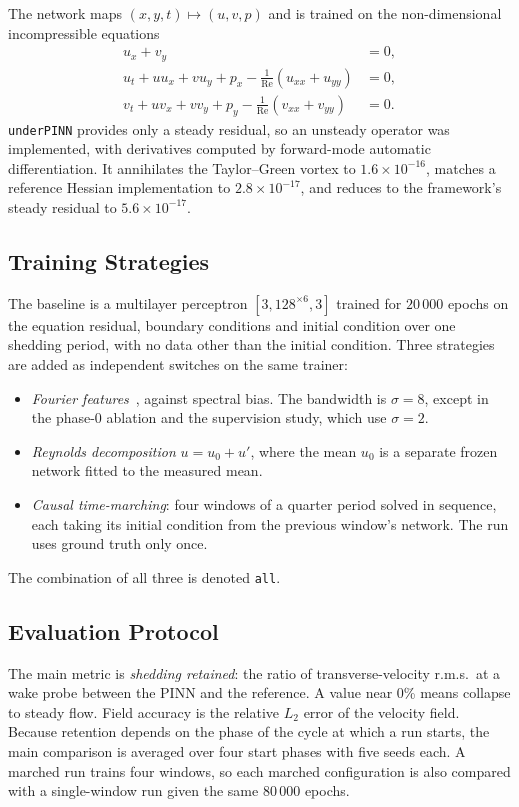 \documentclass[conference]{IEEEtran}
\newcommand{\Rey}{\mathrm{Re}}
\begin{document}
The network maps $(x, y, t) \mapsto (u, v, p)$ and is trained on the
non-dimensional incompressible equations
\begin{align}
u_x + v_y &= 0, \\
u_t + u u_x + v u_y + p_x - \tfrac{1}{\Rey}(u_{xx} + u_{yy}) &= 0, \\
v_t + u v_x + v v_y + p_y - \tfrac{1}{\Rey}(v_{xx} + v_{yy}) &= 0.
\end{align}
\texttt{underPINN} provides only a steady residual, so an unsteady operator was
implemented, with derivatives computed by forward-mode automatic
differentiation. It annihilates the Taylor--Green vortex to
$1.6\times 10^{-16}$, matches a reference Hessian implementation to
$2.8\times 10^{-17}$, and reduces to the framework's steady residual to
$5.6\times 10^{-17}$.

\subsection{Training Strategies}

The baseline is a multilayer perceptron $[3, 128^{\times 6}, 3]$ trained for
$20\,000$ epochs on the equation residual, boundary conditions and initial
condition over one shedding period, with no data other than the initial
condition. Three strategies are added as independent switches on the same
trainer:
\begin{itemize}
  \item \emph{Fourier features}~\cite{tancik2020}, against spectral bias. The
        bandwidth is $\sigma = 8$, except in the phase-0 ablation and the
        supervision study, which use $\sigma = 2$.
  \item \emph{Reynolds decomposition} $u = u_0 + u'$, where the mean $u_0$ is
        a separate frozen network fitted to the measured mean.
  \item \emph{Causal time-marching}: four windows of a quarter period solved
        in sequence, each taking its initial condition from the previous
        window's network. The run uses ground truth only once.
\end{itemize}
The combination of all three is denoted \texttt{all}.

\subsection{Evaluation Protocol}

The main metric is \emph{shedding retained}: the ratio of transverse-velocity
r.m.s.\ at a wake probe between the PINN and the reference. A value near 0\%
means collapse to steady flow. Field accuracy is the relative $L_2$ error of
the velocity field. Because retention depends on the phase of the cycle at
which a run starts, the main comparison is averaged over four start phases
with five seeds each. A marched run trains four windows, so each marched
configuration is also compared with a single-window run given the same
$80\,000$ epochs.
\end{document}
